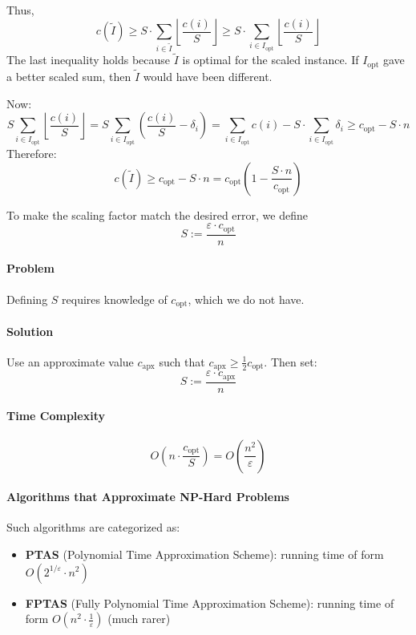 \documentclass{article}
\begin{document}
Thus,
\[
c(\tilde{I}) \ge 
S \cdot \sum_{i \in \tilde{I}} 
\left\lfloor \frac{c(i)}{S} \right\rfloor 
\ge S \cdot \sum_{i \in I_{\text{opt}}} 
\left\lfloor \frac{c(i)}{S} \right\rfloor
\]
The last inequality holds because $\tilde{I}$ is optimal for the scaled instance. 
If $I_{\text{opt}}$ gave a better scaled sum, then $\tilde{I}$ would have been different.

Now:
\[
S \sum_{i \in I_{\text{opt}}}
\left\lfloor \frac{c(i)}{S} \right\rfloor
= S \sum_{i \in I_{\text{opt}}}
\left( \frac{c(i)}{S} - \delta_i \right)
= \sum_{i \in I_{\text{opt}}} c(i)
- S \cdot \sum_{i \in I_{\text{opt}}} \delta_i
\ge c_{\text{opt}} - S \cdot n
\]
Therefore:
\[
c(\tilde{I}) \ge c_{\text{opt}} - S \cdot n 
= c_{\text{opt}} \left( 1 - \frac{S \cdot n}{c_{\text{opt}}} \right)
\]

To make the scaling factor match the desired error, we define
\[
S := \frac{\varepsilon \cdot c_{\text{opt}}}{n}
\]

\paragraph{Problem}
Defining $S$ requires knowledge of $c_{\text{opt}}$, which we do not have.

\paragraph{Solution}
Use an approximate value $c_{\text{apx}}$ such that 
$c_{\text{apx}} \ge \frac{1}{2} c_{\text{opt}}$.
Then set:
\[
S := \frac{\varepsilon \cdot c_{\text{apx}}}{n}
\]

\paragraph{Time Complexity}
\[
O\left( n \cdot \frac{c_{\text{opt}}}{S} \right)
= O\left( \frac{n^2}{\varepsilon} \right)
\]

\paragraph{Algorithms that Approximate NP-Hard Problems}
Such algorithms are categorized as:
\begin{itemize}
    \item \textbf{PTAS} (Polynomial Time Approximation Scheme): 
    running time of form $O(2^{1/\varepsilon} \cdot n^2)$
    \item \textbf{FPTAS} (Fully Polynomial Time Approximation Scheme): 
    running time of form $O(n^2 \cdot \frac{1}{\varepsilon})$ (much rarer)
\end{itemize}
\end{document}
